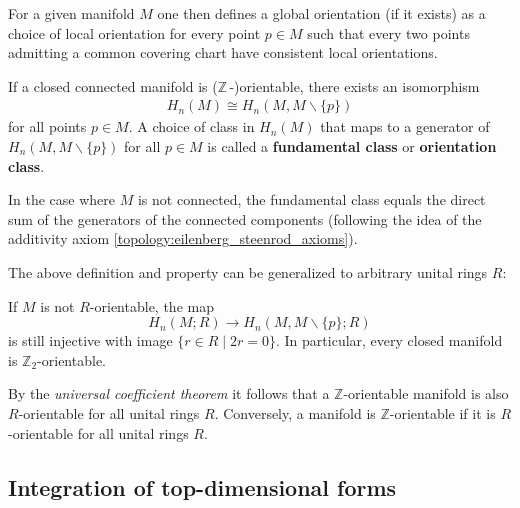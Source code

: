     For a given manifold $M$ one then defines a global orientation (if it exists) as a choice of local orientation for every point $p\in M$ such that every two points admitting a common covering chart have consistent local orientations.

    \begin{property}[Orientability]\label{bundle:orientation_class}
        If a closed connected manifold is ($\mathbb{Z}\,$-)orientable, there exists an isomorphism
        \begin{gather}
            H_n(M)\cong H_n(M,M\backslash\{p\})
        \end{gather}
        for all points $p\in M$. A choice of class in $H_n(M)$ that maps to a generator of $H_n(M,M\backslash\{p\})$ for all $p\in M$ is called a \textbf{fundamental class} or \textbf{orientation class}.

        In the case where $M$ is not connected, the fundamental class equals the direct sum of the generators of the connected components (following the idea of the additivity axiom \ref{topology:eilenberg_steenrod_axioms}).
    \end{property}
    The above definition and property can be generalized to arbitrary unital rings $R$:

    \begin{property}
        If $M$ is not $R$-orientable, the map \[H_n(M;R)\rightarrow H_n(M,M\backslash\{p\};R)\] is still injective with image $\{r\in R\mid 2r=0\}$. In particular, every closed manifold is $\mathbb{Z}_2$-orientable.
    \end{property}

    \begin{property}
        By the \textit{universal coefficient theorem} it follows that a $\mathbb{Z}$-orientable manifold is also $R$-orientable for all unital rings $R$. Conversely, a manifold is $\mathbb{Z}$-orientable if it is $R$-orientable for all unital rings $R$.
    \end{property}

\subsection{Integration of top-dimensional forms}

